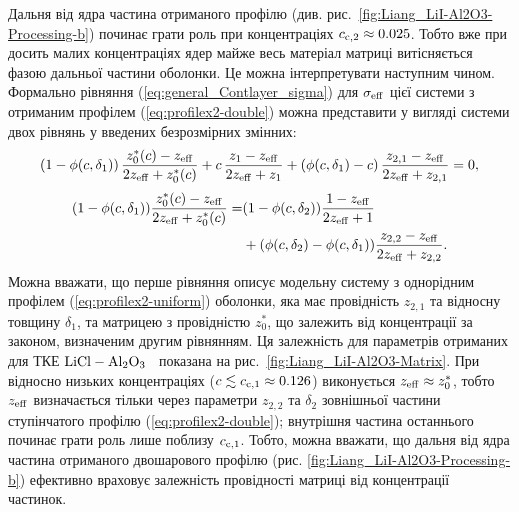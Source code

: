 \documentclass[14pt,twoside]{vakthesis}
\begin{document}
Дальня від ядра частина отриманого профілю (див. рис.~\ref{fig:Liang_LiI-Al2O3-Processing-b}) починає грати роль при концентраціях $c_{{\rm c},2} \approx 0.025$. Тобто вже при досить малих концентраціях ядер майже весь матеріал матриці витісняється фазою дальньої частини оболонки. Це можна інтерпретувати наступним чином.
Формально рівняння (\ref{eq:general_Contlayer_sigma}) для $\sigma_{\rm eff}$ цієї системи з отриманим профілем (\ref{eq:profilex2-double}) можна представити у вигляді системи двох рівнянь у введених безрозмірних змінних:
\begin{equation}\label{eq:conductivityNewMatrix}
\left(1-\phi(c, \delta_1)\right)\frac{{z}^{*}_0(c) -{z}_{\rm
		eff}}{2{z}_{\rm eff}+{z}^{*}_0(c)} + c\,\frac{{z}_1
	-{z}_{\rm
		eff}}{2{z}_{\rm eff}+{z}_1} 
+\left(\phi(c, \delta_1)-c\right)\frac{{z}_{2,1} -{z}_{\rm
		eff}}{2{z}_{\rm eff}+{z}_{2,1}}=0,
\end{equation}
\begin{equation}\label{eq:sigma0-vs-c}
\begin{split}
(1 - \phi(c,\delta_1))\frac{{z}^{*}_0(c) - {z}_{\rm
		eff}}{2{z}_{\rm eff} + {z}^{*}_0(c)} =& (1 - \phi(c,\delta_2))
\frac{1 - {z}_{\rm eff}}{2{z}_{\rm eff} + 1}\\
&+ (\phi(c,\delta_2) - \phi(c,\delta_1)) \frac{{z}_{2,2} -
	{z}_{\rm eff}}{2{z}_{\rm eff} + {z}_{2,2}}.
\end{split}
\end{equation}
Можна вважати, що перше рівняння описує модельну систему з однорідним профілем (\ref{eq:profilex2-uniform}) оболонки, яка має провідність ${z}_{2,1}$ та відносну товщину $\delta_1$, та матрицею з провідністю ${z}^{*}_0$, що залежить від концентрації за законом, визначеним другим рівнянням. 
Ця залежність для параметрів отриманих для ТКЕ $\rm LiCl-Al_2O_3$~\cite{Liang1973} показана на рис.~\ref{fig:Liang_LiI-Al2O3-Matrix}. При відносно низьких концентраціях ($c \lesssim c_{{\rm c},1} \approx 0.126$) виконується ${z}_{\rm eff} \approx {z}^{*}_0$, тобто ${z}_{\rm eff}$ визначається тільки через параметри ${z}_{2,2}$ та $\delta_2$ зовнішньої частини ступінчатого профілю (\ref{eq:profilex2-double}); внутрішня частина останнього починає грати роль лише поблизу $c_{{\rm c},1}$. Тобто, можна вважати, що дальня від ядра частина отриманого двошарового профілю (рис. \ref{fig:Liang_LiI-Al2O3-Processing-b}) ефективно враховує залежність провідності матриці від концентрації частинок. 
\end{document}
